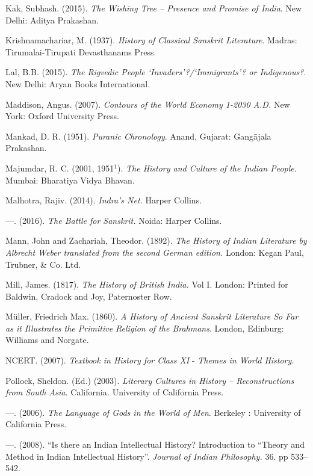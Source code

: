 \begin{thebibliography}{99}
  Kak, Subhash. (2015). \textit{The Wishing Tree – Presence and Promise of India}. New Delhi: Aditya Prakashan.

  Krishnamachariar, M. (1937). \textit{History of Classical Sanskrit Literature}. Madras: Tirumalai-Tirupati Devasthanams Press.

  Lal, B.B. (2015). \textit{The Rigvedic People ‘Invaders’?/‘Immigrants’? or Indigenous?}. New Delhi: Aryan Books International.

  Maddison, Angus. (2007). \textit{Contours of the World Economy 1-2030 A.D.} New York: Oxford University Press.

  Mankad, D. R. (1951). \textit{Puranic Chronology}. Anand, Gujarat: Gangājala Prakashan.

  Majumdar, R. C. (2001, 1951$^{1}$). \textit{The History and Culture of the Indian People}. Mumbai: Bharatiya Vidya Bhavan.

  Malhotra, Rajiv. (2014). \textit{Indra’s Net.} Harper Collins.

  —. (2016). \textit{The Battle for Sanskrit.} Noida: Harper Collins.

  Mann, John and Zachariah, Theodor. (1892). \textit{The History of Indian Literature by Albrecht Weber translated from the second German edition.} London: Kegan Paul, Trubner, \& Co. Ltd.

  Mill, James. (1817). \textit{The History of British India.} Vol I. London: Printed for Baldwin, Cradock and Joy, Paternoster Row.

  Müller, Friedrich Max. (1860). \textit{A History of Ancient Sanskrit Literature So Far as it Illustrates the Primitive Religion of the Brahmans}. London, Edinburg: Williams and Norgate.

  NCERT. (2007). \textit{Textbook in History for Class XI} - \textit{Themes in World History.}

  Pollock, Sheldon. (Ed.) (2003). \textit{Literary Cultures in History – Reconstructions from South Asia.} California\textit{.} University of California Press.

  —. (2006). \textit{The Language of Gods in the World of Men}. Berkeley : University of California Press.

  —. (2008). “Is there an Indian Intellectual History? Introduction to “Theory and Method in Indian Intellectual History”. \textit{Journal of Indian Philosophy.} 36. pp 533–542.


\end{thebibliography}
